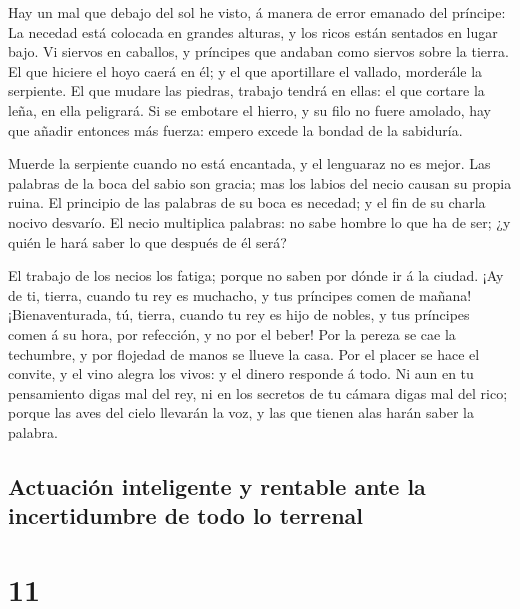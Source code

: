  Hay un mal que debajo del sol he visto, á manera de error
emanado del príncipe:  La necedad está colocada en grandes
alturas, y los ricos están sentados en lugar bajo.  Vi
siervos en caballos, y príncipes que andaban como siervos sobre la
tierra.  El que hiciere el hoyo caerá en él; y el que
aportillare el vallado, morderále la serpiente.  El que
mudare las piedras, trabajo tendrá en ellas: el que cortare la leña, en
ella peligrará.  Si se embotare el hierro, y su filo no
fuere amolado, hay que añadir entonces más fuerza: empero excede la
bondad de la sabiduría.

 Muerde la serpiente cuando no está encantada, y el
lenguaraz no es mejor.  Las palabras de la boca del sabio
son gracia; mas los labios del necio causan su propia ruina.
 El principio de las palabras de su boca es necedad; y el
fin de su charla nocivo desvarío.  El necio multiplica
palabras: no sabe hombre lo que ha de ser; ¿y quién le hará saber lo que
después de él será?

 El trabajo de los necios los fatiga; porque no saben por
dónde ir á la ciudad.  ¡Ay de ti, tierra, cuando tu rey
es muchacho, y tus príncipes comen de mañana! 
¡Bienaventurada, tú, tierra, cuando tu rey es hijo de nobles, y tus
príncipes comen á su hora, por refección, y no por el beber!
 Por la pereza se cae la techumbre, y por flojedad de
manos se llueve la casa.  Por el placer se hace el
convite, y el vino alegra los vivos: y el dinero responde á todo.
 Ni aun en tu pensamiento digas mal del rey, ni en los
secretos de tu cámara digas mal del rico; porque las aves del cielo
llevarán la voz, y las que tienen alas harán saber la palabra.

\hypertarget{actuaciuxf3n-inteligente-y-rentable-ante-la-incertidumbre-de-todo-lo-terrenal}{%
\subsection{Actuación inteligente y rentable ante la incertidumbre de
todo lo
terrenal}\label{actuaciuxf3n-inteligente-y-rentable-ante-la-incertidumbre-de-todo-lo-terrenal}}

\hypertarget{section-21-11}{%
\section{11}\label{section-21-11}}


